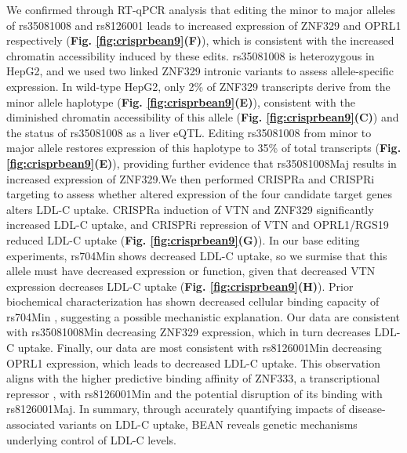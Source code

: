 \documentclass[a4paper, titlepage, openright]{book}
\begin{document}
We confirmed through RT-qPCR analysis that editing the minor to major alleles of rs35081008 and rs8126001 leads to increased expression of ZNF329 and OPRL1 respectively (\textbf{Fig. \ref{fig:crisprbean9}(F)}), which is consistent with the increased chromatin accessibility induced by these edits. rs35081008 is heterozygous in HepG2, and we used two linked ZNF329 intronic variants to assess allele-specific expression. In wild-type HepG2, only 2\% of ZNF329 transcripts derive from the minor allele haplotype (\textbf{Fig. \ref{fig:crisprbean9}(E)}), consistent with the diminished chromatin accessibility of this allele (\textbf{Fig. \ref{fig:crisprbean9}(C)}) and the status of rs35081008 as a liver eQTL. Editing rs35081008 from minor to major allele restores expression of this haplotype to 35\% of total transcripts (\textbf{Fig. \ref{fig:crisprbean9}(E)}), providing further evidence that rs35081008Maj results in increased expression of ZNF329.We then performed CRISPRa and CRISPRi targeting to assess whether altered expression of the four candidate target genes alters LDL-C uptake. CRISPRa induction of VTN and ZNF329 significantly increased LDL-C uptake, and CRISPRi repression of VTN and OPRL1/RGS19 reduced LDL-C uptake (\textbf{Fig. \ref{fig:crisprbean9}(G)}). In our base editing experiments, rs704Min shows decreased LDL-C uptake, so we surmise that this allele must have decreased expression or function, given that decreased VTN expression decreases LDL-C uptake (\textbf{Fig. \ref{fig:crisprbean9}(H)}). Prior biochemical characterization has shown decreased cellular binding capacity of rs704Min , suggesting a possible mechanistic explanation. Our data are consistent with rs35081008Min decreasing ZNF329 expression, which in turn decreases LDL-C uptake. Finally, our data are most consistent with rs8126001Min decreasing OPRL1 expression, which leads to decreased LDL-C uptake. This observation aligns with the higher predictive binding affinity of ZNF333, a transcriptional repressor \citep{jing2004identification, witzgall1994kruppel}, with rs8126001Min and the potential disruption of its binding with rs8126001Maj. In summary, through accurately quantifying impacts of disease-associated variants on LDL-C uptake, BEAN reveals genetic mechanisms underlying control of LDL-C levels.
\end{document}
